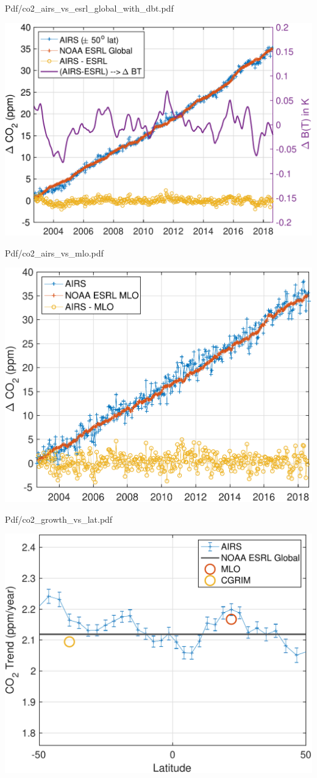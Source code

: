 \documentclass[10pt,t]{beamer}
\begin{document}
\begin{frame}[label={sec:orgb936739}]{Pdf/co2\_airs\_vs\_esrl\_global\_with\_dbt.pdf}
\begin{center}
\includegraphics[width=0.7\linewidth]{./Figs/Pdf/co2_airs_vs_esrl_global_with_dbt.pdf}
\end{center}
\end{frame}

\begin{frame}[label={sec:org6d48160}]{Pdf/co2\_airs\_vs\_mlo.pdf}
\begin{center}
\includegraphics[width=0.7\linewidth]{./Figs/Pdf/co2_airs_vs_mlo.pdf}
\end{center}
\end{frame}

\begin{frame}[label={sec:org4b35865}]{Pdf/co2\_growth\_vs\_lat.pdf}
\begin{center}
\includegraphics[width=0.7\linewidth]{./Figs/Pdf/co2_growth_vs_lat.pdf}
\end{center}
\end{frame}
\end{document}
